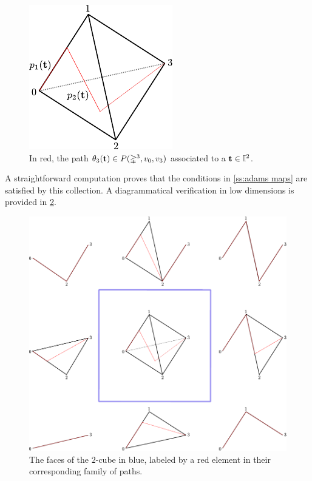 \begin{figure}
	\centering
	\includegraphics[scale=1]{aux/theta1.pdf}
	\caption{In red, the path $\theta_3(\mathbf{t}) \in P(\mathbb{\Delta}^3, v_0, v_3)$ associated to a $\mathbf{t} \in \mathbb{I}^2$.}
	\label{f:theta1}
\end{figure}

A straightforward computation proves that the conditions in \cref{ss:adams maps} are satisfied by this collection.
A diagrammatical verification in low dimensions is provided in \cref{f:theta3}.

\begin{figure}[b]
	\centering
	\includegraphics[scale=.5]{aux/theta3.pdf}
	\caption{The faces of the $2$-cube in blue, labeled by a red element in their corresponding family of paths.}
	\label{f:theta3}
\end{figure}

